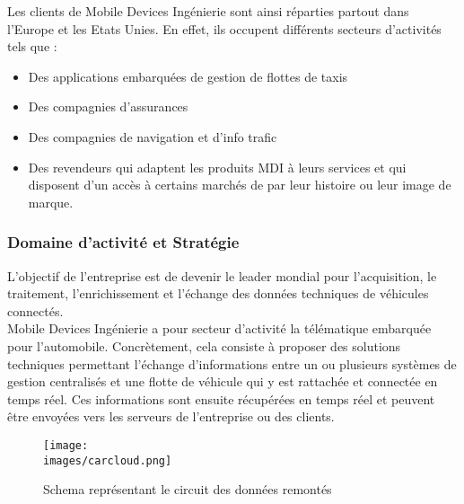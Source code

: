             
            Les clients de Mobile Devices Ingénierie sont ainsi réparties partout dans l'Europe et les Etats Unies. 
            En effet, ils occupent différents secteurs d’activités tels que :\\
            \begin{itemize}
                \renewcommand{\labelitemi}{$\bullet$}
                \item Des applications embarquées de gestion de flottes de taxis 
                \item Des compagnies d’assurances 
                \item Des compagnies de navigation et d'info trafic 
                \item Des revendeurs qui adaptent les produits MDI à leurs services et qui disposent d’un accès à certains marchés de par leur histoire ou leur image de marque.
            \end{itemize}


        \subsubsection{Domaine d'activité et Stratégie }
            L’objectif de l'entreprise est de devenir le leader mondial pour l'acquisition, le
            traitement, l'enrichissement et l’échange des données techniques de véhicules
            connectés.\\

            Mobile Devices Ingénierie a pour secteur d’activité la télématique embarquée pour l'automobile. 
            Concrètement, cela consiste à proposer des solutions techniques permettant l'échange d'informations 
            entre un ou plusieurs systèmes de gestion centralisés et une flotte de véhicule qui y est rattachée 
            et connectée en temps réel.
            Ces informations sont ensuite récupérées en temps réel et peuvent être envoyées 
            vers les serveurs de l’entreprise ou des clients. \\

            \begin{figure}[ht]
                \centering
                \texttt{[image: \\images/carcloud.png]}
                \caption{Schema représentant le circuit des données remontés  }
            \end{figure}
            
